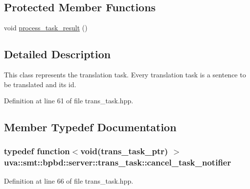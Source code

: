\subsection*{Protected Member Functions}
\begin{DoxyCompactItemize}
\item 
void \hyperlink{classuva_1_1smt_1_1bpbd_1_1server_1_1trans__task_a73c3298cc2d8ab7eaadc7d3e08e444bd}{process\+\_\+task\+\_\+result} ()
\end{DoxyCompactItemize}


\subsection{Detailed Description}
This class represents the translation task. Every translation task is a sentence to be translated and its id. 

Definition at line 61 of file trans\+\_\+task.\+hpp.



\subsection{Member Typedef Documentation}
\hypertarget{classuva_1_1smt_1_1bpbd_1_1server_1_1trans__task_aa3ee37277c0d0fd6ffdb44b67f1a5384}{}
\subsubsection[{cancel\+\_\+task\+\_\+notifier}]{\setlength{\rightskip}{0pt plus 5cm}typedef function$<$void({\bf trans\+\_\+task\+\_\+ptr}) $>$ {\bf uva\+::smt\+::bpbd\+::server\+::trans\+\_\+task\+::cancel\+\_\+task\+\_\+notifier}}\label{classuva_1_1smt_1_1bpbd_1_1server_1_1trans__task_aa3ee37277c0d0fd6ffdb44b67f1a5384}


Definition at line 66 of file trans\+\_\+task.\+hpp.

\hypertarget{classuva_1_1smt_1_1bpbd_1_1server_1_1trans__task_a0bbeddd9f0896c3ecb32ed4c2c5e66e1}{}
